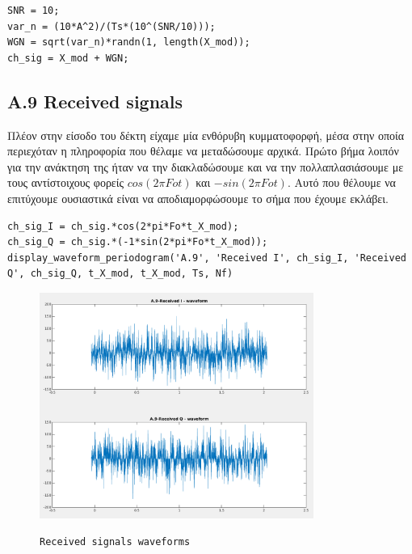 \documentclass[11pt]{article}
\begin{document}
    \begin{lstlisting}[caption = {A.8 \texttt{}}]
% A.8
SNR = 10;
var_n = (10*A^2)/(Ts*(10^(SNR/10)));
WGN = sqrt(var_n)*randn(1, length(X_mod));
ch_sig = X_mod + WGN;
    \end{lstlisting}
    
    \subsection*{A.9 Received signals}
    Πλέον στην είσοδο του δέκτη είχαμε μία ενθόρυβη κυμματοφορφή, μέσα στην οποία περιεχόταν η πληροφορία που θέλαμε να μεταδώσουμε αρχικά.
    Πρώτο βήμα λοιπόν για την ανάκτηση της ήταν να την διακλαδώσουμε και να την πολλαπλασιάσουμε με τους αντίστοιχους φορείς $cos(2 \pi Fo t)$ και $-sin(2 \pi Fo t)$.
    Αυτό που θέλουμε να επιτύχουμε ουσιαστικά είναι να αποδιαμορφώσουμε το σήμα που έχουμε εκλάβει. 
    
    \begin{lstlisting}[caption = {A.9 \texttt{}}]
% A.9
ch_sig_I = ch_sig.*cos(2*pi*Fo*t_X_mod);
ch_sig_Q = ch_sig.*(-1*sin(2*pi*Fo*t_X_mod));
display_waveform_periodogram('A.9', 'Received I', ch_sig_I, 'Received Q', ch_sig_Q, t_X_mod, t_X_mod, Ts, Nf)
    \end{lstlisting}
    
    \begin{figure}[H]
        \centering
        \includegraphics[scale=0.5, width=0.8\textwidth]{img/A9_rec_wave.png} \\
        \caption{\texttt{Received signals waveforms}}
    \end{figure}
    
\end{document}
